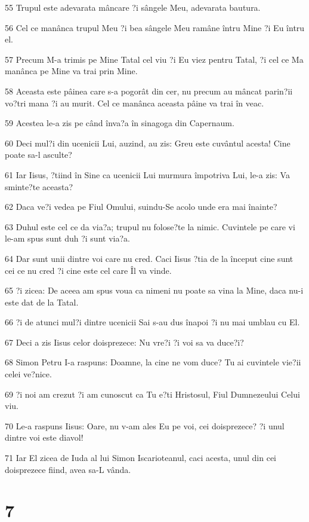 \par 55 Trupul este adevarata mâncare ?i sângele Meu, adevarata bautura.
\par 56 Cel ce manânca trupul Meu ?i bea sângele Meu ramâne întru Mine ?i Eu întru el.
\par 57 Precum M-a trimis pe Mine Tatal cel viu ?i Eu viez pentru Tatal, ?i cel ce Ma manânca pe Mine va trai prin Mine.
\par 58 Aceasta este pâinea care s-a pogorât din cer, nu precum au mâncat parin?ii vo?tri mana ?i au murit. Cel ce manânca aceasta pâine va trai în veac.
\par 59 Acestea le-a zis pe când înva?a în sinagoga din Capernaum.
\par 60 Deci mul?i din ucenicii Lui, auzind, au zis: Greu este cuvântul acesta! Cine poate sa-l asculte?
\par 61 Iar Iisus, ?tiind în Sine ca ucenicii Lui murmura împotriva Lui, le-a zis: Va sminte?te aceasta?
\par 62 Daca ve?i vedea pe Fiul Omului, suindu-Se acolo unde era mai înainte?
\par 63 Duhul este cel ce da via?a; trupul nu folose?te la nimic. Cuvintele pe care vi le-am spus sunt duh ?i sunt via?a.
\par 64 Dar sunt unii dintre voi care nu cred. Caci Iisus ?tia de la început cine sunt cei ce nu cred ?i cine este cel care Îl va vinde.
\par 65 ?i zicea: De aceea am spus voua ca nimeni nu poate sa vina la Mine, daca nu-i este dat de la Tatal.
\par 66 ?i de atunci mul?i dintre ucenicii Sai s-au dus înapoi ?i nu mai umblau cu El.
\par 67 Deci a zis Iisus celor doisprezece: Nu vre?i ?i voi sa va duce?i?
\par 68 Simon Petru I-a raspuns: Doamne, la cine ne vom duce? Tu ai cuvintele vie?ii celei ve?nice.
\par 69 ?i noi am crezut ?i am cunoscut ca Tu e?ti Hristosul, Fiul Dumnezeului Celui viu.
\par 70 Le-a raspuns Iisus: Oare, nu v-am ales Eu pe voi, cei doisprezece? ?i unul dintre voi este diavol!
\par 71 Iar El zicea de Iuda al lui Simon Iscarioteanul, caci acesta, unul din cei doisprezece fiind, avea sa-L vânda.

\chapter{7}

